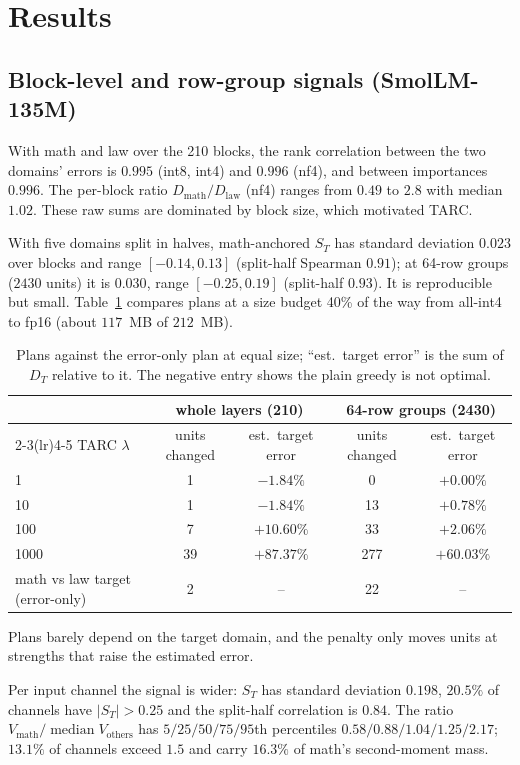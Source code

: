 \documentclass[11pt]{article}
\newcommand{\med}{\operatorname{median}}
\begin{document}
\section{Results}

\subsection{Block-level and row-group signals (SmolLM-135M)}
With math and law over the 210 blocks, the rank correlation between the two domains' errors is $0.995$ (int8, int4) and $0.996$ (nf4), and between importances $0.996$.
The per-block ratio $D_{\text{math}}/D_{\text{law}}$ (nf4) ranges from $0.49$ to $2.8$ with median $1.02$. These raw sums are dominated by block size, which motivated TARC.

With five domains split in halves, math-anchored $S_T$ has standard deviation $0.023$ over blocks and range $[-0.14,0.13]$ (split-half Spearman $0.91$);
at 64-row groups ($2430$ units) it is $0.030$, range $[-0.25,0.19]$ (split-half $0.93$). It is reproducible but small.
Table~\ref{tab:plans} compares plans at a size budget 40\% of the way from all-int4 to fp16 (about $117$~MB of $212$~MB).
\begin{table}[h]
\centering\small
\begin{tabular}{lcccc}
\toprule
 & \multicolumn{2}{c}{whole layers (210)} & \multicolumn{2}{c}{64-row groups (2430)}\\
\cmidrule(lr){2-3}\cmidrule(lr){4-5}
TARC $\lambda$ & units changed & est.\ target error & units changed & est.\ target error\\
\midrule
1    & 1  & $-1.84\%$ & 0   & $+0.00\%$\\
10   & 1  & $-1.84\%$ & 13  & $+0.78\%$\\
100  & 7  & $+10.60\%$ & 33  & $+2.06\%$\\
1000 & 39 & $+87.37\%$ & 277 & $+60.03\%$\\
\midrule
math vs law target (error-only) & 2 & -- & 22 & --\\
\bottomrule
\end{tabular}
\caption{Plans against the error-only plan at equal size; ``est.\ target error'' is the sum of $D_T$ relative to it. The negative entry shows the plain greedy is not optimal.}
\label{tab:plans}
\end{table}
Plans barely depend on the target domain, and the penalty only moves units at strengths that raise the estimated error.

Per input channel the signal is wider: $S_T$ has standard deviation $0.198$, $20.5\%$ of channels have $|S_T|>0.25$ and the split-half correlation is $0.84$.
The ratio $V_{\text{math}}/\med V_{\text{others}}$ has $5/25/50/75/95$th percentiles $0.58/0.88/1.04/1.25/2.17$; $13.1\%$ of channels exceed $1.5$ and carry $16.3\%$ of math's second-moment mass.
\end{document}

